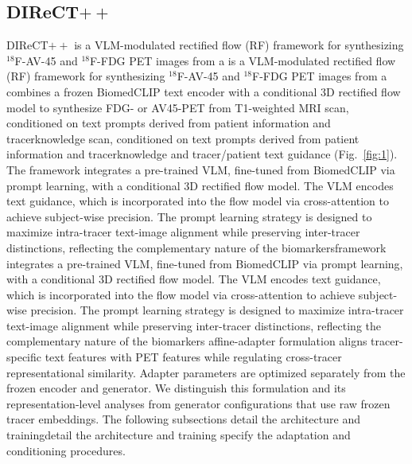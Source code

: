 \documentclass{article}
\providecommand{\DIFaddtex}[1]{{\protect\color{blue} \sf #1}} %
\providecommand{\DIFdeltex}[1]{{\protect\color{red} \ifmmode #1\else\scriptsize #1\fi}} %
\providecommand{\DIFaddbegin}{} %
\providecommand{\DIFaddend}{} %
\providecommand{\DIFdelbegin}{} %
\providecommand{\DIFdelend}{} %
\providecommand{\DIFadd}[1]{\texorpdfstring{\DIFaddtex{#1}}{#1}} %
\providecommand{\DIFdel}[1]{\texorpdfstring{\DIFdeltex{#1}}{}} %
\newcommand{\DIFscaledelfig}{0.5}
\newlength{\DIFdelgraphicswidth} %
\newlength{\DIFdelgraphicsheight} %
\newcommand{\DIFaddincludegraphics}[2][]{{\color{blue}\fbox{\DIFOincludegraphics[#1]{#2}}}} %
\newcommand{\DIFdelincludegraphics}[2][]{%
\sbox{\DIFdelgraphicsbox}{\DIFOincludegraphics[#1]{#2}}%
\settoboxwidth{\DIFdelgraphicswidth}{\DIFdelgraphicsbox} %
\settoboxtotalheight{\DIFdelgraphicsheight}{\DIFdelgraphicsbox} %
\scalebox{\DIFscaledelfig}{%
\parbox[b]{\DIFdelgraphicswidth}{\usebox{\DIFdelgraphicsbox}\\[-\baselineskip] \rule{\DIFdelgraphicswidth}{0em}}\llap{\resizebox{\DIFdelgraphicswidth}{\DIFdelgraphicsheight}{%
\setlength{\unitlength}{\DIFdelgraphicswidth}%
\begin{picture}(1,1)%
\thicklines\linethickness{2pt} %
{\color[rgb]{1,0,0}\put(0,0){\framebox(1,1){}}}%
{\color[rgb]{1,0,0}\put(0,0){\line( 1,1){1}}}%
{\color[rgb]{1,0,0}\put(0,1){\line(1,-1){1}}}%
\end{picture}%
}\hspace*{3pt}}} %
} %
\DeclareRobustCommand{\DIFaddbegin}{\DIFOaddbegin \let\includegraphics\DIFaddincludegraphics} %
\DeclareRobustCommand{\DIFaddend}{\DIFOaddend \let\includegraphics\DIFOincludegraphics} %
\DeclareRobustCommand{\DIFdelbegin}{\DIFOdelbegin \let\includegraphics\DIFdelincludegraphics} %
\DeclareRobustCommand{\DIFdelend}{\DIFOaddend \let\includegraphics\DIFOincludegraphics} %
\begin{document}
\subsection{\texorpdfstring{DIReCT$++$}{DIReCT++}}
DIReCT$++$ \DIFdelbegin \DIFdel{is a VLM-modulated rectified flow (RF) framework for synthesizing $^{18}$F-AV-45 and $^{18}$F-FDG PET images from a }\DIFdelend \DIFaddbegin \DIFadd{combines a frozen BiomedCLIP text encoder with a conditional 3D rectified flow model to synthesize FDG- or AV45-PET from }\DIFaddend T1-weighted MRI \DIFdelbegin \DIFdel{scan, conditioned on text prompts derived from patient information and tracerknowledge }\DIFdelend \DIFaddbegin \DIFadd{and tracer/patient text guidance }\DIFaddend (Fig.~\ref{fig:1}). The \DIFdelbegin \DIFdel{framework integrates a pre-trained VLM, fine-tuned from BiomedCLIP via prompt learning, with a conditional 3D rectified flow model. The VLM encodes text guidance, which is incorporated into the flow model via cross-attention to achieve subject-wise precision. The prompt learning strategy is designed to maximize intra-tracer text-image alignment while preserving inter-tracer distinctions, reflecting the complementary nature of the biomarkers}\DIFdelend \DIFaddbegin \DIFadd{affine-adapter formulation aligns tracer-specific text features with PET features while regulating cross-tracer representational similarity. Adapter parameters are optimized separately from the frozen encoder and generator. We distinguish this formulation and its representation-level analyses from generator configurations that use raw frozen tracer embeddings}\DIFaddend . The following subsections \DIFdelbegin \DIFdel{detail the architecture and training}\DIFdelend \DIFaddbegin \DIFadd{specify the adaptation and conditioning procedures}\DIFaddend .
\end{document}
